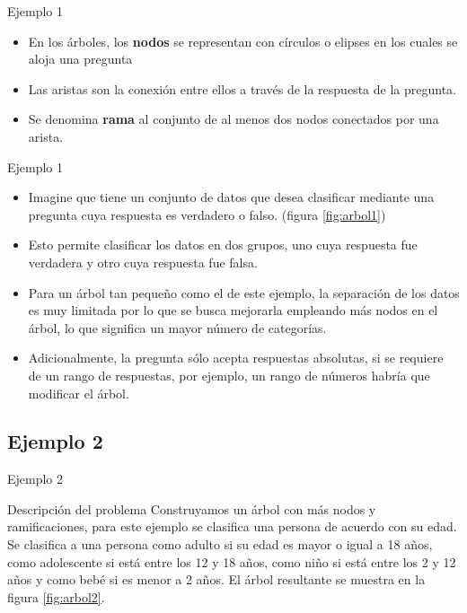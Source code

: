 \documentclass[11pt,aspectratio=169]{beamer}
\begin{document}
\begin{frame}{Ejemplo 1}
	\begin{itemize}
		\item En los árboles, los \textbf{nodos} se representan con círculos o elipses 
		en los cuales se aloja una pregunta \pause 
		\item Las aristas son la conexión entre ellos a través de la respuesta de la 
		pregunta. 
		\item Se denomina \textbf{rama} al conjunto de al menos dos nodos conectados 
		por una arista.
	\end{itemize}
\end{frame}

\begin{frame}{Ejemplo 1}
	\begin{itemize}
		\item Imagine que tiene un conjunto de datos que desea clasificar mediante 
		una pregunta cuya respuesta es verdadero o falso. (figura \ref{fig:arbol1}) \pause
		\item Esto permite clasificar los datos en dos grupos, uno cuya respuesta 
		fue verdadera y otro cuya respuesta fue falsa. \pause
		\item Para un árbol tan pequeño como el de este ejemplo, la separación de 
		los datos es muy limitada por lo que se busca mejorarla empleando más nodos 
		en el árbol, lo que significa un mayor número de categorías.\pause
		\item Adicionalmente, la pregunta sólo acepta respuestas absolutas, si se 
		requiere de un rango de respuestas, por ejemplo, un rango de números 
		habría que modificar el árbol.
	\end{itemize}
\end{frame}

\subsection{Ejemplo 2}
\begin{frame}{Ejemplo 2}
	\begin{block}{Descripción del problema}
		Construyamos un árbol con más nodos y ramificaciones, para este ejemplo se clasifica una persona de acuerdo con su edad. \pause
		Se clasifica a una persona como adulto si su edad es mayor o igual a 18 años, como adolescente si está entre los 12 y 18 años, 
		como niño si está entre los 2 y 12 años y como bebé si es menor a 2 años. \pause
		El árbol resultante se muestra en la figura \ref{fig:arbol2}.
	\end{block}
\end{frame}
\end{document}
